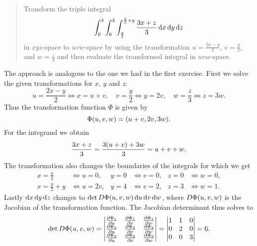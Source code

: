 \documentclass{exercise}
\begin{document}
	\section{}

	\begin{quote}
		Transform the triple integral
		\begin{equation}
			\int_0^3 \int_0^4 \int_{\frac{y}{2}}^{\frac{y}{2} + y}\frac{3x + z}{3}\mathop{\mathrm{d}\!} x\mathop{\mathrm{d}\!} y\mathop{\mathrm{d}\!} z
		\end{equation}
		in \(xyz\)-space to \(uvw\)-space by using the transformation \(u = \frac{2x - y}{2}\), \(v = \frac{y}{2}\), and \(w = \frac{z}{3}\) and then evaluate the transformed integral in \(uvw\)-space.
	\end{quote}

	The approach is analogous to the one we had in the first exercise.
	First we solve the given transformations for \(x\), \(y\) and \(z\):
	\[
		u = \frac{2x - y}{2} \iff x = u + v, \quad v = \frac{y}{2} \iff y = 2v, \quad w = \frac{z}{3} \iff z = 3w.
	\]
	Thus the transformation function \(\Phi\) is given by
	\[
		\Phi\parentheses*{u, v, w} = \parentheses*{u + v, 2v, 3w}.
	\]
	For the integrand we obtain
	\[
		\frac{3x + z}{3} = \frac{3\parentheses*{u + v} + 3w}{3} = u + v + w.
	\]
	The transformation also changes the boundaries of the integrals for which we get
	\begin{align*}
		x = \frac{y}{2} &\iff u = 0, & y = 0 &\iff v = 0, & z = 0 &\iff w = 0,\\
		x = \frac{y}{2} + y &\iff u = 2v, & y = 4 &\iff v = 2, & z = 3 &\iff w = 1.
	\end{align*}
	Lastly \(\mathop{\mathrm{d}\!} x\mathop{\mathrm{d}\!} y\mathop{\mathrm{d}\!} z\) changes to \(\det D\Phi\parentheses*{u, v, w}\d u\d v\d w\), where \(D\Phi\parentheses*{u, v, w}\) is the Jacobian of the transformation function.
	The Jacobian determinant thus solves to
	\[
		\det D\Phi\parentheses*{u, v, w} = \begin{vmatrix}
			\frac{\partial \Phi_1}{\partial u} & \frac{\partial \Phi_1}{\partial v} & \frac{\partial \Phi_1}{\partial w}\\
			\frac{\partial \Phi_2}{\partial u} & \frac{\partial \Phi_2}{\partial v} & \frac{\partial \Phi_2}{\partial w}\\
			\frac{\partial \Phi_3}{\partial u} & \frac{\partial \Phi_3}{\partial v} & \frac{\partial \Phi_3}{\partial w}\\
		\end{vmatrix} = \begin{vmatrix}
			1 & 1 & 0\\
			0 & 2 & 0\\
			0 & 0 & 3
		\end{vmatrix} = 6.
	\]
\end{document}
